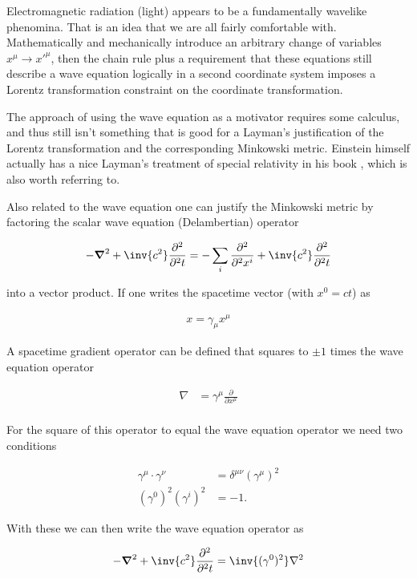 \documentclass{article}      %
\newcommand{\grad}[0]{\nabla}
\newcommand{\spacegrad}[0]{\boldsymbol{\nabla}}
\newcommand{\PD}[2]{\frac{\partial {#2}}{\partial {#1}}}
\newcommand{\PDsq}[2]{\frac{\partial^2 {#2}}{\partial^2 {#1}}}
\begin{document}
Electromagnetic radiation (light) appears to be a fundamentally wavelike phenomina.  That is an idea that we are all fairly
comfortable with.  Mathematically and mechanically introduce an arbitrary change of variables $x^{\mu} \rightarrow {x'}^{\mu}$,
then the chain rule plus a requirement that these equations still describe a wave equation logically in a second coordinate system
imposes a Lorentz transformation constraint on the coordinate transformation.  

The approach of using the wave equation as a motivator requires some calculus, and thus still isn't something that
is good for a Layman's justification of the
Lorentz transformation and the corresponding Minkowski metric.  Einstein himself actually has a nice Layman's treatment of
special relativity in his book \cite{einstein2005rsa}, which is also worth referring to.

Also related to the wave equation one can justify the Minkowski metric by factoring the scalar wave equation (Delambertian) operator

\begin{align*}
-\spacegrad^2 + \inv{c^2}\PDsq{t}{} = -\sum_i \PDsq{x^{i}}{} +\inv{c^2}\PDsq{t}{}
\end{align*}

into a vector product.  If one writes the spacetime vector (with $x^0 = ct$) as

\begin{align*}
x = \gamma_{\mu} x^{\mu}
\end{align*}

A spacetime gradient operator can be defined that squares to $\pm 1$ times the wave equation operator

\begin{align*}
\grad &= \gamma^{\mu} \PD{x^{\mu}}{} \\
\end{align*}

For the square of this operator to equal the wave equation operator we need two conditions

\begin{align*}
\gamma^{\mu} \cdot \gamma^{\nu} &= \delta^{\mu\nu} {\left(\gamma^{\mu}\right)}^2 \\
(\gamma^0)^2 (\gamma^i)^2 &= -1.
\end{align*}

With these we can then write the wave equation operator as

\begin{align*}
-\spacegrad^2 + \inv{c^2}\PDsq{t}{} = \inv{(\gamma^0)^2} \grad^2
\end{align*}
\end{document}
